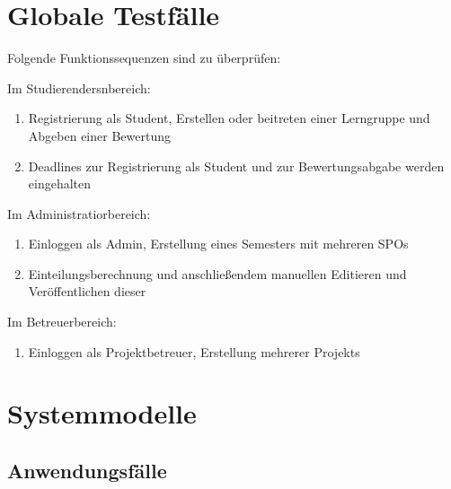 \documentclass[parskip=full]{scrartcl}
\newcommand{\swtLabel}[1]{\textbf{/#1\arabic*0/}}
\begin{document}
\section{Globale Testfälle}
Folgende Funktionssequenzen sind zu überprüfen:

Im \glspl{Studierender}nbereich:


\begin{enumerate} [label=\swtLabel{T}]
  
  
  \item Registrierung als Student, Erstellen oder beitreten einer  \gls{Lerngruppe} und Abgeben einer \gls{Bewertung}
  \item Deadlines zur Registrierung als Student und zur \gls{Bewertung}sabgabe werden eingehalten

\end{enumerate}
Im Administratiorbereich:
   \begin{enumerate} [label=\swtLabel{T}, resume]
  \item Einloggen als \gls{Admin}, Erstellung eines Semesters mit mehreren \glspl{SPO}
  \item \gls{Einteilung}sberechnung und anschließendem manuellen Editieren und
  Veröffentlichen dieser
\end{enumerate}
  Im Betreuerbereich:
   \begin{enumerate} [label=\swtLabel{T}, resume]
  \item Einloggen als \gls{Projektbetreuer}, Erstellung mehrerer \glspl{Projekt}
\end{enumerate}



\section{Systemmodelle}

\subsection{Anwendungsfälle}
\end{document}
